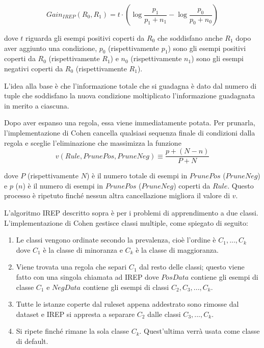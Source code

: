 $$
Gain_{IREP}(R_0,R_1) = t \cdot \left(\log{\dfrac{p_1}{p_1 + n_1}} - \log{\dfrac{p_0}{p_0 + n_0}}\right)
$$

dove $t$ riguarda gli esempi positivi coperti da $R_0$ che soddisfano anche $R_1$ dopo aver aggiunto una condizione, $p_0$ (rispettivamente $p_1$) sono gli esempi positivi coperti da $R_0$ (rispettivamente $R_1$) e  $n_0$ (rispettivamente $n_1$) sono gli esempi negativi coperti da $R_0$ (rispettivamente $R_1$).

L'idea alla base è che l'informazione totale che si guadagna è dato dal numero di tuple che soddisfano la nuova condizione moltiplicato l'informazione guadagnata in merito a ciascuna\cite{Quinlan1990}.

Dopo aver espanso una regola, essa viene immediatamente potata. Per prunarla, l'implementazione di Cohen cancella qualsiasi sequenza finale di condizioni dalla regola e sceglie l'eliminazione che massimizza la funzione
\begin{equation}
	\label{eq:rulval}
	v(Rule, PrunePos, PruneNeg) \equiv \frac{p + (N - n)}{P + N}
\end{equation}

dove $P$ (rispettivamente $N$) è il numero totale di esempi in $PrunePos$ \linebreak ($PruneNeg$) e $p$ ($n$) è il numero di esempi in $PrunePos$ ($PruneNeg$) coperti da $Rule$. Questo processo è ripetuto finché nessun altra cancellazione migliora il valore di $v$.

L'algoritmo IREP descritto sopra è per i problemi di apprendimento a due classi. L'implementazione di Cohen gestisce classi multiple, come spiegato di seguito:
\begin{enumerate}
	\item Le classi vengono ordinate secondo la prevalenza, cioè l'ordine è $C_1,...,C_k$ dove $C_1$ è la classe di minoranza e $C_k$ è la classe di maggioranza.
	\item Viene trovata una regola che separi $C_1$ dal resto delle classi; questo viene fatto con una singola chiamata ad IREP dove $PosData$ contiene gli esempi di classe $C_1$ e $NegData$ contiene gli esempi di classi $C_2,C_3,...,C_k$.
	\item Tutte le istanze coperte dal ruleset appena addestrato sono rimosse dal dataset e IREP si appresta a separare $C_2$ dalle classi $C_3,...,C_k$.
	\item Si ripete finché rimane la sola classe $C_k$. Quest'ultima verrà usata come classe di default.
\end{enumerate}

